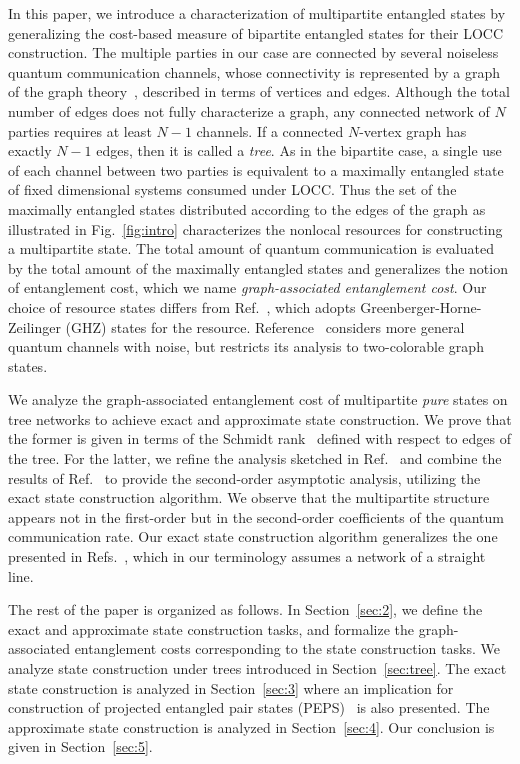 \documentclass[preprintnumbers,aps,amsmath,amssymb,pra,twocolumn,showpacs,superscriptaddress,floatfix]{revtex4-1}
\theoremstyle{plain}
\theoremstyle{definition}
\theoremstyle{remark}
\begin{document}
In this paper, we introduce a characterization of multipartite entangled states by generalizing the cost-based measure of bipartite entangled states for their LOCC construction.  The multiple parties in our case are connected by several noiseless quantum communication channels, whose 
 connectivity is represented by a graph of the graph theory~\cite{RefWorks:152}, described in terms of vertices and edges.
Although the total number of edges does not fully characterize a graph, any connected network of $N$ parties requires at least $N-1$ channels.   If a connected $N$-vertex graph has exactly $N-1$ edges, then it is called a \textit{tree}.  As in the bipartite case, a single use of each channel between two parties is equivalent to a maximally entangled state of fixed dimensional systems consumed under LOCC\@.  Thus the set of the maximally entangled states distributed according to the edges of the graph as illustrated in Fig.~\ref{fig:intro} characterizes the nonlocal resources for constructing a multipartite state.
The total amount of quantum communication is evaluated by the total amount of the maximally entangled states and generalizes the notion of entanglement cost, which we name \textit{graph-associated entanglement cost}.
Our choice of resource states differs from Ref.~\cite{32}, which adopts Greenberger-Horne-Zeilinger (GHZ) states for the resource.   Reference~\cite{45} considers more general quantum channels with noise, but restricts its analysis to two-colorable graph states.

We analyze the graph-associated entanglement cost of multipartite \textit{pure} states on tree networks to achieve exact and approximate state construction.  We prove that the former is given in terms of the Schmidt rank~\cite{RefWorks:157} defined with respect to edges of the tree.  For the latter, we refine the analysis sketched in Ref.~\cite{RefWorks:148} and combine the results of Ref.~\cite{RefWorks:160} to provide the second-order asymptotic analysis, utilizing the exact state construction algorithm.  We observe that the multipartite structure appears not in the first-order but in the second-order coefficients of the quantum communication rate.  Our exact state construction algorithm generalizes the one presented in Refs.~\cite{PRL110503,PRA032311}, which in our terminology assumes a network of a straight line.


The rest of the paper is organized as follows.  In Section~\ref{sec:2}, we define the exact and approximate state construction tasks, and formalize the graph-associated entanglement costs corresponding to the state construction tasks.  We analyze state construction under trees introduced in Section~\ref{sec:tree}.  The exact state construction is analyzed in Section~\ref{sec:3} where an implication for construction of projected entangled pair states (PEPS)~\cite{PEPS} is also presented.  The approximate state construction is analyzed in Section~\ref{sec:4}.  Our conclusion is given in Section~\ref{sec:5}.
\end{document}
